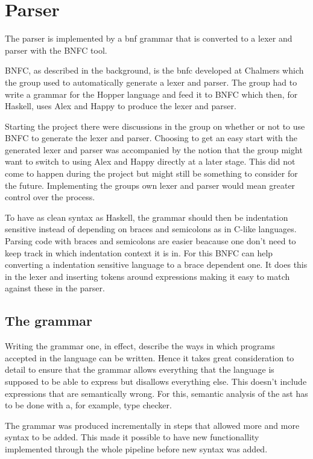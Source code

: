 \section{Parser}


The parser is implemented by a \gls{bnf} grammar that is converted to a lexer and 
parser with the BNFC tool. 

BNFC, as described in the background, is the \Gls{bnfc} developed at Chalmers which the group used to automatically generate a lexer and parser. The group had to write a grammar for the Hopper language and feed it to BNFC which then, for Haskell, uses Alex\cite{alex} and Happy\cite{happy} to produce the lexer and parser.

Starting the project there were discussions in the group on whether or not to use BNFC to generate the lexer and parser. Choosing to get an easy start with the generated lexer and parser was accompanied by the notion that the group might want to switch to using Alex and Happy directly at a later stage. This did not come to happen during the project but might still be something to consider for the future. Implementing the groups own lexer and parser would mean greater control over the process.

To have as clean syntax as Haskell, the grammar should then be indentation sensitive instead of depending on braces and semicolons as in C-like languages. Parsing code with braces and semicolons are easier beacause one don't need to keep track in which indentation context it is in. For this BNFC can help converting a indentation sensitive language to a brace dependent one. It does this in the lexer and inserting tokens around expressions making it easy to match against these in the parser.

\subsection{The grammar}

Writing the grammar one, in effect, describe the ways in which programs accepted in the language can be written. Hence it takes great consideration to detail to ensure that the grammar allows everything that the language is supposed to be able to express but disallows everything else. This doesn't include expressions that are semantically wrong. For this, semantic analysis of the \gls{ast} has to be done with a, for example, type checker. 

The grammar was produced incrementally in steps that allowed more and more syntax to be added. This made it possible to have new functionallity implemented through the whole pipeline before new syntax was added. 

